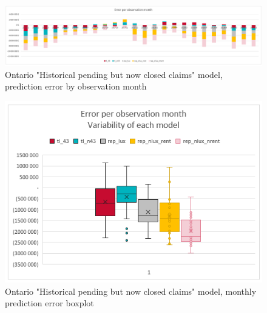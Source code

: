 		\begin{figure}[H]
			\begin{center}
				\includegraphics[scale=0.4]{Graphiques/ON_closedonly_model_by_month} 
				\renewcommand{\figurename}{Figure}
				\caption{Ontario "Historical  pending but now closed claims" model, prediction error by observation month}\label{Fig_ON_closedonly_er_by_month}
			\end{center}
		\end{figure}
		\begin{figure}[H]
			\begin{center}
				\includegraphics[scale=0.4]{Graphiques/ON_closedonly_model_mustach} 
				\renewcommand{\figurename}{Figure}
				\caption{Ontario "Historical  pending but now closed claims" model, monthly prediction error boxplot}\label{Fig_ON_closedonly_er_boxplot}
			\end{center}
		\end{figure}


